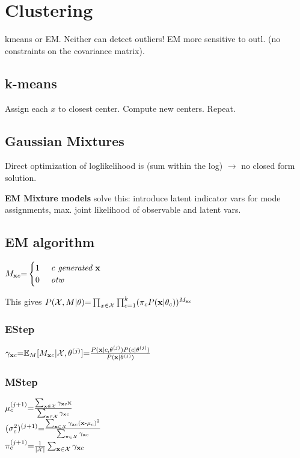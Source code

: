 \section{Clustering}
k\text{-}means or EM.
Neither can detect outliers! EM more sensitive to outl. (no constraints on the covariance matrix).

\subsection{k-means}
Assign each $x$ to closest center. Compute new centers. Repeat.
\subsection{Gaussian Mixtures}
Direct optimization of log\text{-}likelihood is (sum within the log) $\to$ no closed form solution. 

\textbf{EM Mixture models} solve this: introduce latent indicator vars for mode assignments, max. joint likelihood of observable and latent vars.

\subsection{EM algorithm}
$M_{\mathbf x c} \text{=} 
	\begin{cases}
		1 &\textit{ c  generated } \mathbf x\\
		0 &\textit{ otw }
	\end{cases}
$

This gives
$	P(\mathcal X, M|\theta) \text{=} \prod_{x\in\mathcal X}\prod_{c\text{=}1}^k(\pi_c P(\mathbf x|\theta_c))^{M_{\mathbf x c}}$


\subsubsection{E\text{-}Step}
$ \gamma_{\mathbf x c} \text{=} \mathbb E_M[M_{\mathbf x c}| \mathcal X, \theta^{(j)}]\text{=}\frac{P(\mathbf x|c, \theta^{(j)})P(c|\theta^{(j)})}{P(\mathbf x|\theta^{(j)})}$

\subsubsection{M\text{-}Step}
$			\mu_c^{(j\text{+}1)} \text{=} \frac{\sum_{\mathbf x\in \mathcal X}\gamma_{\mathbf x c}\mathbf x}{\sum_{\mathbf x\in \mathcal X}\gamma_{\mathbf x c}}$ \\
			$(\sigma_c^2)^{(j\text{+}1)} \text{=} \frac{\sum_{\mathbf x\in \mathcal X}\gamma_{\mathbf x c}(\mathbf x\text{-}\mu_c)^2}{\sum_{\mathbf x\in \mathcal X}\gamma_{\mathbf x c}} $\\
		$\pi_c^{(j\text{+}1)} \text{=} \frac{1}{|\mathcal X|}\sum_{\mathbf x\in \mathcal X}\gamma_{\mathbf x c}$

